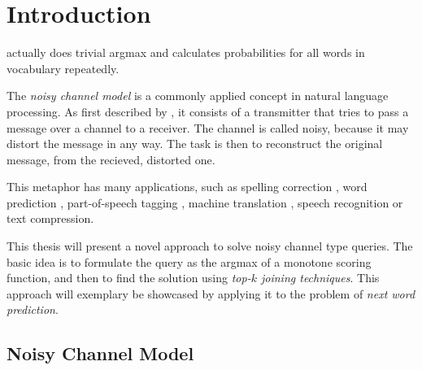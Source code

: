 \chapter{Introduction}
\label{ch:introduction}


\begin{draft}
\textcite{Bickel2005} actually does trivial argmax and calculates probabilities
for all words in vocabulary repeatedly.
\end{draft}

The \emph{noisy channel model} is a commonly applied concept in natural language
processing.
As first described by \textcite{Shannon1948}, it consists of a transmitter that
tries to pass a message over a channel to a receiver.
The channel is called noisy, because it may distort the message in any way.
The task is then to reconstruct the original message, from the recieved,
distorted one.

This metaphor has many applications, such as spelling correction
\parencite{JurafskyMartin2009,Manning2008,Kernighan1990,Mays1991},
word prediction \parencite{Bickel2005}, part-of-speech tagging
\parencite{Church1988}, machine translation \parencite{Brown1990}, speech
recognition or text compression.

This thesis will present a novel approach to solve noisy channel type queries.
The basic idea is to formulate the query as the argmax of a monotone scoring
function, and then to find the solution using \emph{top-$k$ joining techniques}.
This approach will exemplary be showcased by applying it to the problem of
\emph{next word prediction}.

\section{Noisy Channel Model}

